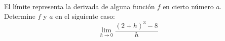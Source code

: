 \item El límite representa la derivada de alguna función $f$ en cierto número $a$. Determine $f$ y $a$ en el siguiente caso:
$$\lim_{h \to 0} \frac{(2 + h)^3 - 8}{h}$$
